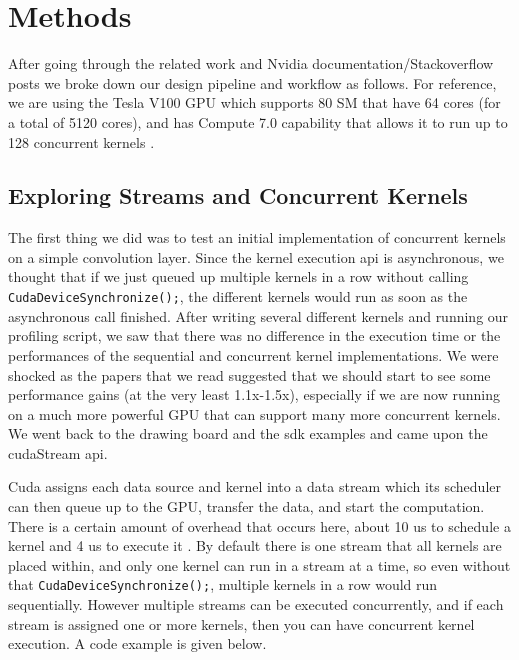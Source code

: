 \documentclass[sigconf]{acmart}
\begin{document}
\section{Methods}

After going through the related work and Nvidia documentation/Stackoverflow posts we broke down our design pipeline and workflow as follows. For reference, we are using the Tesla V100 GPU which supports 80 SM that have 64 cores (for a total of 5120 cores), and has Compute 7.0 capability that allows it to run up to 128 concurrent kernels \cite{nvidia_spec}. 

\subsection{Exploring Streams and Concurrent Kernels}
The first thing we did was to test an initial implementation of concurrent kernels on a simple convolution layer. Since the kernel execution api is asynchronous, we thought that if we just queued up multiple kernels in a row without calling \lstinline{CudaDeviceSynchronize();}, the different kernels would run as soon as the asynchronous call finished. After writing several different kernels and running our profiling script, we saw that there was no difference in the execution time or the performances of the sequential and concurrent kernel implementations. We were shocked as the papers that we read suggested that we should start to see some performance gains (at the very least 1.1x-1.5x), especially if we are now running on a much more powerful GPU that can support many more concurrent kernels. We went back to the drawing board and the sdk examples and came upon the cudaStream api.

Cuda assigns each data source and kernel into a data stream which its scheduler can then queue up to the GPU, transfer the data, and start the computation. There is a certain amount of overhead that occurs here, about 10 us to schedule a kernel and 4 us to execute it \cite{michaelmichael}. By default there is one stream that all kernels are placed within, and only one kernel can run in a stream at a time, so even without that \lstinline{CudaDeviceSynchronize();}, multiple kernels in a row would run sequentially. However multiple streams can be executed concurrently, and if each stream is assigned one or more kernels, then you can have concurrent kernel execution. A code example is given below. 
\end{document}

